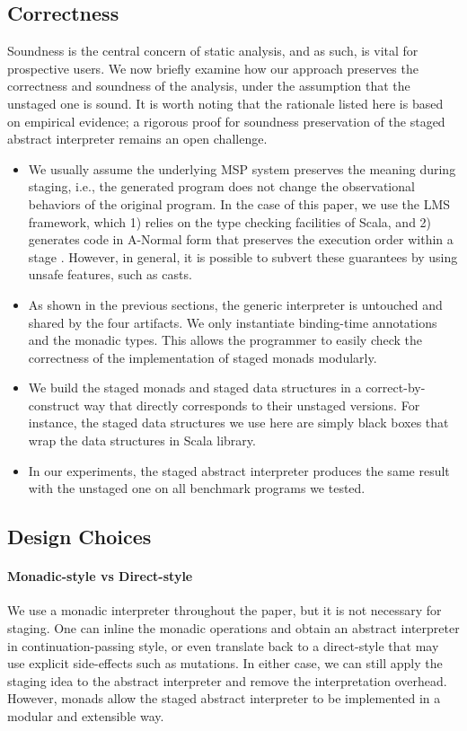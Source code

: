\subsection{Correctness}

Soundness is the central concern of static analysis, and as such, is vital
for prospective users. We now briefly examine how our
approach preserves the correctness and soundness of the analysis, under the
assumption that the unstaged one is sound. It is worth noting that the rationale
listed here is based on empirical evidence; a rigorous proof for soundness
preservation of the staged abstract interpreter remains an open challenge.

\begin{itemize}
  \item We usually assume the underlying MSP system preserves the meaning during staging,
    i.e., the generated program does not change the observational
    behaviors of the original program. In the case of this paper, we use the
    LMS framework, which 1) relies on the type checking facilities of Scala, and
    2) generates code in A-Normal form \cite{Flanagan:1993:ECC:155090.155113}
    that preserves the execution order within a stage \cite{DBLP:conf/birthday/Rompf16}.
    However, in general, it is possible to subvert these guarantees by
    using unsafe features, such as casts.
  \item As shown in the previous sections, the generic interpreter is untouched
    and shared by the four artifacts. We only instantiate binding-time
    annotations and the monadic types. This allows the programmer to easily
    check the correctness of the implementation of staged monads modularly.
  \item We build the staged monads and staged data structures in a
    correct-by-construct way that directly corresponds to their unstaged
    versions. For instance, the staged data structures we use here are simply
    black boxes that wrap the data structures in Scala library.
  \item In our experiments, the staged abstract interpreter produces the same
    result with the unstaged one on all benchmark programs we tested.
\end{itemize}

\subsection{Design Choices}

\paragraph{Monadic-style vs Direct-style} We use a monadic interpreter
throughout the paper, but it is not necessary for staging. One can inline the
monadic operations and obtain an abstract interpreter in continuation-passing
style, or even translate back to a direct-style that may use explicit
side-effects such as mutations. In either case, we can still apply the staging
idea to the abstract interpreter and remove the interpretation overhead.
However, monads allow the staged abstract interpreter to be implemented in a
modular and extensible way.

